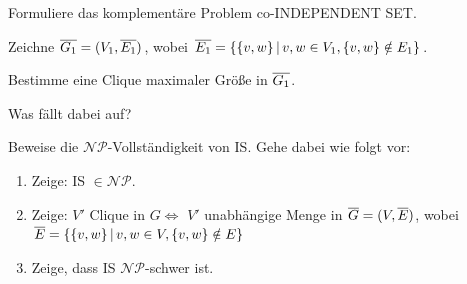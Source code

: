 \begin{frame}
{}

 {
	Formuliere das komplementäre Problem co-INDEPENDENT SET.
}

 {
	Zeichne $\neglit{G_1}=(V_1, \neglit{E_1})$, wobei $\neglit{E_1}=\menge{\{v, w\}}{v, w \in V_1, \{v,w\} \notin E_1}$.
	
        Bestimme eine Clique maximaler Größe in $\neglit{G_1}$.
        
        Was fällt dabei auf?
}

 {

Beweise die $\mathcal{NP}$-Vollständigkeit von IS. Gehe dabei wie folgt vor:
\begin{enumerate}
 \item Zeige: IS $\in \mathcal{NP}$.
 \item Zeige: $V'$ Clique in $G \Longleftrightarrow$ $V'$ unabhängige Menge in $\neglit{G}=(V, \neglit{E})$, wobei $\neglit{E}= \menge{\{v, w\}}{v, w \in V, \{v, w\} \notin E}$
 \item Zeige, dass IS $\mathcal{NP}$-schwer ist.
\end{enumerate}


}
\end{frame}


